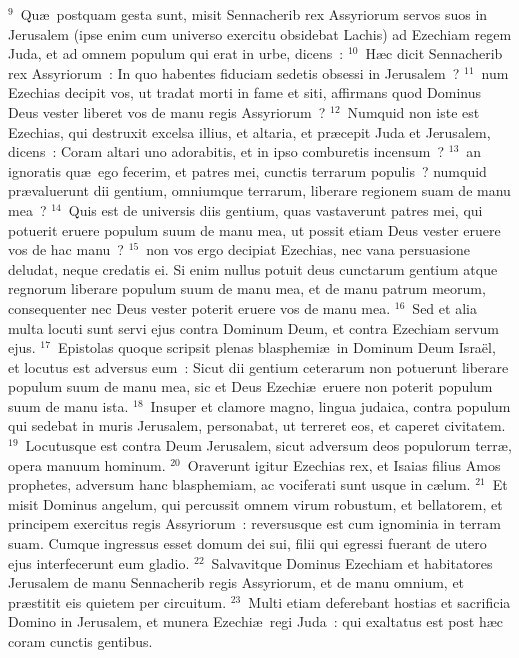 ${}^{9}$~Qu\ae\ postquam gesta sunt, misit Sennacherib rex Assyriorum servos suos in Jerusalem (ipse enim cum universo exercitu obsidebat Lachis) ad Ezechiam regem Juda, et ad omnem populum qui erat in urbe, dicens~:
${}^{10}$~H\ae c dicit Sennacherib rex Assyriorum~: In quo habentes fiduciam sedetis obsessi in Jerusalem~?
${}^{11}$~num Ezechias decipit vos, ut tradat morti in fame et siti, affirmans quod Dominus Deus vester liberet vos de manu regis Assyriorum~?
${}^{12}$~Numquid non iste est Ezechias, qui destruxit excelsa illius, et altaria, et pr\ae cepit Juda et Jerusalem, dicens~: Coram altari uno adorabitis, et in ipso comburetis incensum~?
${}^{13}$~an ignoratis qu\ae\ ego fecerim, et patres mei, cunctis terrarum populis~? numquid pr\ae valuerunt dii gentium, omniumque terrarum, liberare regionem suam de manu mea~?
${}^{14}$~Quis est de universis diis gentium, quas vastaverunt patres mei, qui potuerit eruere populum suum de manu mea, ut possit etiam Deus vester eruere vos de hac manu~?
${}^{15}$~non vos ergo decipiat Ezechias, nec vana persuasione deludat, neque credatis ei. Si enim nullus potuit deus cunctarum gentium atque regnorum liberare populum suum de manu mea, et de manu patrum meorum, consequenter nec Deus vester poterit eruere vos de manu mea.
${}^{16}$~Sed et alia multa locuti sunt servi ejus contra Dominum Deum, et contra Ezechiam servum ejus.
${}^{17}$~Epistolas quoque scripsit plenas blasphemi\ae\ in Dominum Deum Isra\"el, et locutus est adversus eum~: Sicut dii gentium ceterarum non potuerunt liberare populum suum de manu mea, sic et Deus Ezechi\ae\ eruere non poterit populum suum de manu ista.
${}^{18}$~Insuper et clamore magno, lingua judaica, contra populum qui sedebat in muris Jerusalem, personabat, ut terreret eos, et caperet civitatem.
${}^{19}$~Locutusque est contra Deum Jerusalem, sicut adversum deos populorum terr\ae , opera manuum hominum.
${}^{20}$~Oraverunt igitur Ezechias rex, et Isaias filius Amos prophetes, adversum hanc blasphemiam, ac vociferati sunt usque in c\ae lum.
${}^{21}$~Et misit Dominus angelum, qui percussit omnem virum robustum, et bellatorem, et principem exercitus regis Assyriorum~: reversusque est cum ignominia in terram suam. Cumque ingressus esset domum dei sui, filii qui egressi fuerant de utero ejus interfecerunt eum gladio.
${}^{22}$~Salvavitque Dominus Ezechiam et habitatores Jerusalem de manu Sennacherib regis Assyriorum, et de manu omnium, et pr\ae stitit eis quietem per circuitum.
${}^{23}$~Multi etiam deferebant hostias et sacrificia Domino in Jerusalem, et munera Ezechi\ae\ regi Juda~: qui exaltatus est post h\ae c coram cunctis gentibus.


